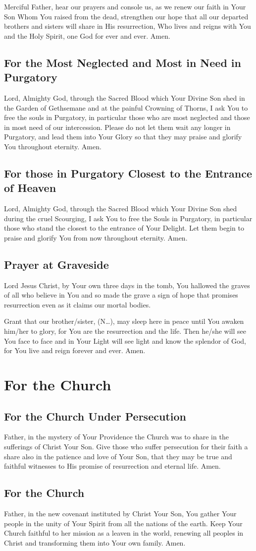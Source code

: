 \documentclass[12pt]{article}
\newcommand{\prayersection}[1]{\section{#1}}
\newcommand{\prayertitle}[1]{\subsection{#1}}
\newcommand{\insertname}{(N\dots)\xspace}
\begin{document}
Merciful Father, hear our prayers and console us, as we renew our faith in Your Son Whom You raised from the dead, strengthen our hope that all our departed brothers and sisters will share in His resurrection, Who lives and reigns with You and the Holy Spirit, one God for ever and ever.
Amen.

\prayertitle{For the Most Neglected and Most in Need in Purgatory}
\label{prayer:most_neglected_purgatory}
Lord, Almighty God, through the Sacred Blood which Your Divine Son shed in the Garden of Gethsemane and at the painful Crowning of Thorns, I ask You to free the souls in Purgatory, in particular those who are most neglected and those in most need of our intercession.
Please do not let them wait any longer in Purgatory, and lead them into Your Glory so that they may praise and glorify You throughout eternity.
Amen.

\prayertitle{For those in Purgatory Closest to the Entrance of Heaven}
\label{prayer:purgatory_closest_heaven}
Lord, Almighty God, through the Sacred Blood which Your Divine Son shed during the cruel Scourging, I ask You to free the Souls in Purgatory, in particular those who stand the closest to the entrance of Your Delight.
Let them begin to praise and glorify You from now throughout eternity.
Amen.

\prayertitle{Prayer at Graveside}
\label{prayer:graveside}
Lord Jesus Christ, by Your own three days in the tomb, You hallowed the graves of all who believe in You and so made the grave a sign of hope that promises resurrection even as it claims our mortal bodies.

Grant that our brother/sister, \insertname, may sleep here in peace until You awaken him/her to glory, for You are the resurrection and the life.
Then he/she will see You face to face and in Your Light will see light and know the splendor of God, for You live and reign forever and ever.
Amen.

\newpage

\prayersection{For the Church}
\prayertitle{For the Church Under Persecution}
Father, in the mystery of Your Providence the Church was to share in the sufferings of Christ Your Son.
Give those who suffer persecution for their faith a share also in the patience and love of Your Son, that they may be true and faithful witnesses to His promise of resurrection and eternal life.
Amen.

\prayertitle{For the Church}
Father, in the new covenant instituted by Christ Your Son, You gather Your people in the unity of Your Spirit from all the nations of the earth.
Keep Your Church faithful to her mission as a leaven in the world, renewing all peoples in Christ and transforming them into Your own family.
Amen.
\end{document}
